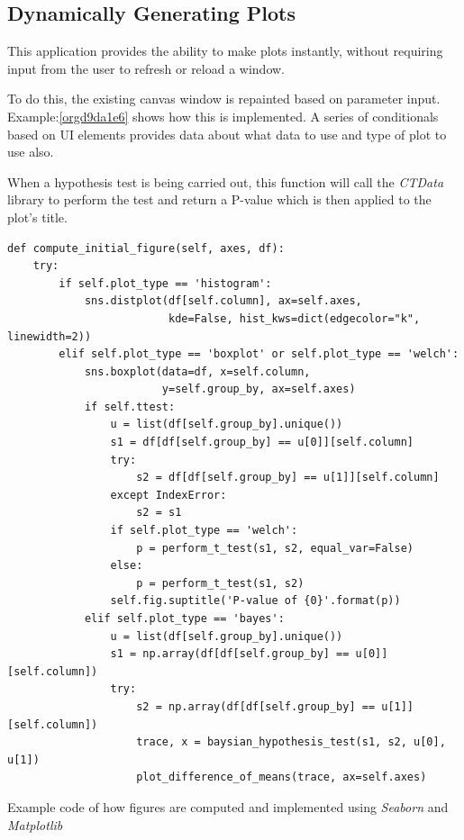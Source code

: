 \documentclass[11pt]{report}
\begin{document}
\subsection{Dynamically Generating Plots}
\label{sec:orga924cb3}
This application provides the ability to make plots instantly, without requiring input from the user to refresh or reload a window.

To do this, the existing canvas window is repainted based on parameter input. Example:\ref{orgd9da1e6}
shows how this is implemented. A series of conditionals based on UI elements provides data about what data to use and type of plot to use also.

When a hypothesis test is being carried out, this function will call the \emph{CTData} library to perform the test and return a P-value which is then applied to the plot's title.

\begin{listing}[htbp]
\begin{verbatim}
def compute_initial_figure(self, axes, df):
    try:
        if self.plot_type == 'histogram':
            sns.distplot(df[self.column], ax=self.axes,
                         kde=False, hist_kws=dict(edgecolor="k", linewidth=2))
        elif self.plot_type == 'boxplot' or self.plot_type == 'welch':
            sns.boxplot(data=df, x=self.column,
                        y=self.group_by, ax=self.axes)
            if self.ttest:
                u = list(df[self.group_by].unique())
                s1 = df[df[self.group_by] == u[0]][self.column]
                try:
                    s2 = df[df[self.group_by] == u[1]][self.column]
                except IndexError:
                    s2 = s1
                if self.plot_type == 'welch':
                    p = perform_t_test(s1, s2, equal_var=False)
                else:
                    p = perform_t_test(s1, s2)
                self.fig.suptitle('P-value of {0}'.format(p))
            elif self.plot_type == 'bayes':
                u = list(df[self.group_by].unique())
                s1 = np.array(df[df[self.group_by] == u[0]][self.column])
                try:
                    s2 = np.array(df[df[self.group_by] == u[1]][self.column])
                    trace, x = baysian_hypothesis_test(s1, s2, u[0], u[1])
                    plot_difference_of_means(trace, ax=self.axes)
\end{verbatim}
\caption{\label{orgd9da1e6}
Example code of how figures are computed and implemented using \emph{Seaborn} and \emph{Matplotlib}}
\end{listing}
\end{document}
